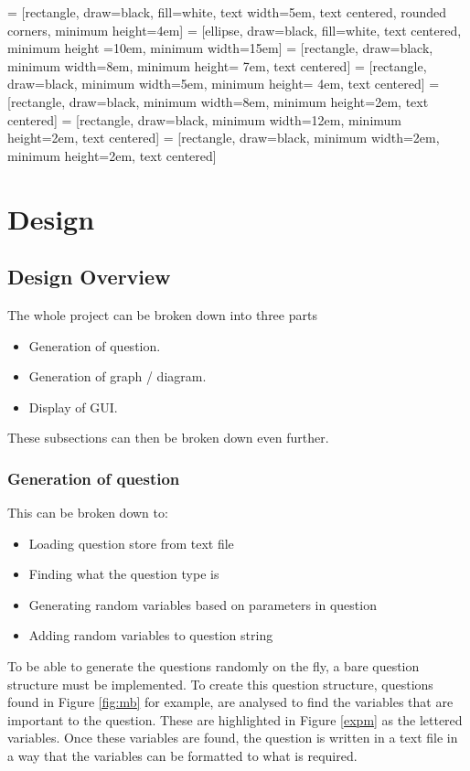  = [rectangle, draw=black, fill=white, text width=5em, text centered, rounded corners, minimum height=4em]
 = [ellipse, draw=black, fill=white, text centered, minimum height =10em, minimum width=15em]
 = [rectangle, draw=black, minimum width=8em, minimum height= 7em, text centered]
 = [rectangle, draw=black, minimum width=5em, minimum height= 4em, text centered]
 = [rectangle, draw=black, minimum width=8em, minimum height=2em, text centered]
 = [rectangle, draw=black, minimum width=12em, minimum height=2em, text centered]
 = [rectangle, draw=black, minimum width=2em, minimum height=2em, text centered]
\chapter{Design}
\section{Design Overview}
The whole project can be broken down into three parts
\begin{itemize}
	\item Generation of question.
	\item Generation of graph / diagram.
	\item Display of GUI.
\end{itemize}
These subsections can then be broken down even further.
\subsection{Generation of question}
This can be broken down to:
\begin{itemize}
	\item Loading question store from text file
	\item Finding what the question type is
	\item Generating random variables based on parameters in question
	\item Adding random variables to question string
\end{itemize}
To be able to generate the questions randomly on the fly, a bare question structure must be implemented. To create this question structure, questions found in Figure \ref{fig:mb} for example, are analysed to find the variables that are important to the question. These are highlighted in Figure \ref{expm} as the lettered variables. Once these variables are found, the question is written in a text file in a way that the variables can be formatted to what is required.
